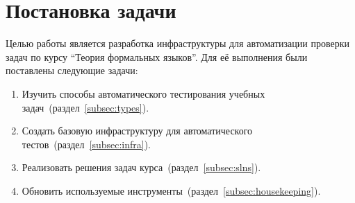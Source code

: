
\section{Постановка задачи}
\label{sec:task}

Целью работы является разработка инфраструктуры для автоматизации проверки задач по курсу \enquote{Теория формальных языков}.
Для её выполнения были поставлены следующие задачи:
\begin{enumerate}
    \item Изучить способы автоматического тестирования учебных задач~(раздел~\ref{subsec:types}).
    \item Создать базовую инфраструктуру для автоматического тестов~(раздел~\ref{subsec:infra}).
    \item Реализовать решения задач курса~(раздел~\ref{subsec:slns}).
    \item Обновить используемые инструменты~(раздел~\ref{subsec:housekeeping}). 
\end{enumerate}
